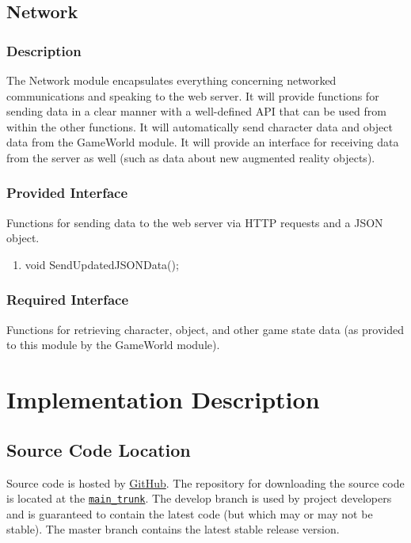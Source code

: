 \documentclass[10pt,letterpaper,oneside,english]{article}
\newcommand{\chref}[2]{\href{#1}{{\color{blue!60!black}#2}}}
\begin{document}
\subsection{Network}

\subsubsection{Description}
The Network module encapsulates everything concerning networked communications and speaking to the web server. It will provide functions for sending data in a clear manner with a well-defined API that can be used from within the other functions. It will automatically send character data and object data from the GameWorld module. It will provide an interface for receiving data from the server as well (such as data about new augmented reality objects).

\subsubsection{Provided Interface}
Functions for sending data to the web server via HTTP requests and a JSON object.
\begin{enumerate}
\item void SendUpdatedJSONData();	
\end{enumerate}

\subsubsection{Required Interface}
	Functions for retrieving character, object, and other game state data (as provided to this module by the GameWorld module).

\section{Implementation Description}

\subsection{Source Code Location}
Source code is hosted by \chref{https://github.com}{GitHub}. The repository for downloading the source code is located at the \chref{https://github.com/UPS-CS240-F12/main_trunk.git}{\texttt{main\_trunk}}. The develop branch is used by project developers and is guaranteed to contain the latest code (but which may or may not be stable). The master branch contains the latest stable release version.
\end{document}

